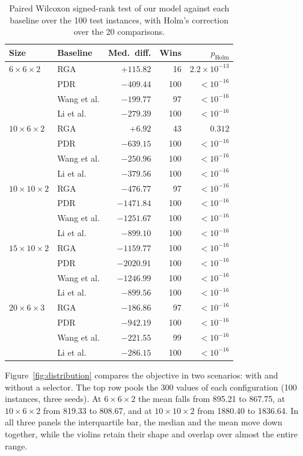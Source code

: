 \begin{table}[t]
\centering
\caption{Paired Wilcoxon signed-rank test of our model against each
baseline over the 100 test instances, with Holm's correction over the 20
comparisons.}
\label{tab:signif}
\footnotesize
\setlength{\tabcolsep}{3.0pt}
\begin{tabular}{llrrr}
\toprule
Size & Baseline & Med.\ diff. & Wins & $p_{\mathrm{Holm}}$ \\
\midrule
$6\times6\times2$ & RGA & $+115.82$ & 16 & $2.2\times10^{-13}$ \\
 & PDR & $-409.44$ & 100 & $<10^{-16}$ \\
 & Wang et al. & $-199.77$ & 97 & $<10^{-16}$ \\
 & Li et al. & $-279.39$ & 100 & $<10^{-16}$ \\
$10\times6\times2$ & RGA & $+6.92$ & 43 & $0.312$ \\
 & PDR & $-639.15$ & 100 & $<10^{-16}$ \\
 & Wang et al. & $-250.96$ & 100 & $<10^{-16}$ \\
 & Li et al. & $-379.56$ & 100 & $<10^{-16}$ \\
$10\times10\times2$ & RGA & $-476.77$ & 97 & $<10^{-16}$ \\
 & PDR & $-1471.84$ & 100 & $<10^{-16}$ \\
 & Wang et al. & $-1251.67$ & 100 & $<10^{-16}$ \\
 & Li et al. & $-899.10$ & 100 & $<10^{-16}$ \\
$15\times10\times2$ & RGA & $-1159.77$ & 100 & $<10^{-16}$ \\
 & PDR & $-2020.91$ & 100 & $<10^{-16}$ \\
 & Wang et al. & $-1246.99$ & 100 & $<10^{-16}$ \\
 & Li et al. & $-899.56$ & 100 & $<10^{-16}$ \\
$20\times6\times3$ & RGA & $-186.86$ & 97 & $<10^{-16}$ \\
 & PDR & $-942.19$ & 100 & $<10^{-16}$ \\
 & Wang et al. & $-221.55$ & 99 & $<10^{-16}$ \\
 & Li et al. & $-286.15$ & 100 & $<10^{-16}$ \\
\bottomrule
\end{tabular}
\end{table}

Figure~\ref{fig:distribution} compares the objective in two scenarios: with and without a selector.
The top row pools the 300 values of each configuration (100 instances, three
seeds). At $6\times6\times2$ the mean falls from 895.21 to 867.75, at
$10\times6\times2$ from 819.33 to 808.67, and at $10\times10\times2$ from
1880.40 to 1836.64. In all three panels the interquartile bar, the median and
the mean move down together, while the violins retain their shape and overlap
over almost the entire range.


